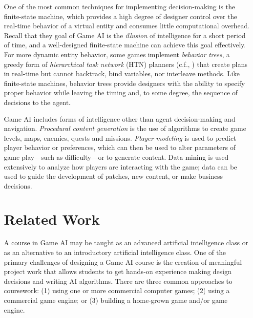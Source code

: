 \documentclass[letterpaper]{article}
\begin{document}
One of the most common techniques for implementing decision-making is the finite-state machine, which provides a high degree of designer control over the real-time behavior of a virtual entity and consumes little computational overhead.
Recall that they goal of Game AI is the {\em illusion} of intelligence for a short period of time, and a well-designed finite-state machine can achieve this goal effectively.
For more dynamic entity behavior, some games implement {\em behavior trees}, a greedy form of {\em hierarchical task network} (HTN) planners (c.f., \cite{ghallab04}) that create plans in real-time but cannot backtrack, bind variables, nor interleave methods.
Like finite-state machines, behavior trees provide designers with the ability to specify proper behavior while leaving the timing and, to some degree, the sequence of decisions to the agent.

Game AI includes forms of intelligence other than agent decision-making and navigation.
{\em Procedural content generation} is the use of algorithms to create game levels, maps, enemies, quests and missions. 
{\em Player modeling} is used to predict player behavior or preferences, which can then be used to alter parameters of game play---such as difficulty---or to generate content.
Data mining is used extensively to analyze how players are interacting with the game; data can be used to guide the development of patches, new content, or make business decisions.



\section{Related Work}



A course in Game AI may be taught as an advanced artificial intelligence class or as an alternative to an introductory artificial intelligence class.
One of the primary challenges of designing a Game AI course is the creation of meaningful project work that allows students to get hands-on experience making design decisions and writing AI algorithms.
There are three common approaches to coursework: 
(1) using one or more commercial computer games; 
(2) using a commercial game engine; 
or
(3) building a home-grown game and/or game engine.
\end{document}
